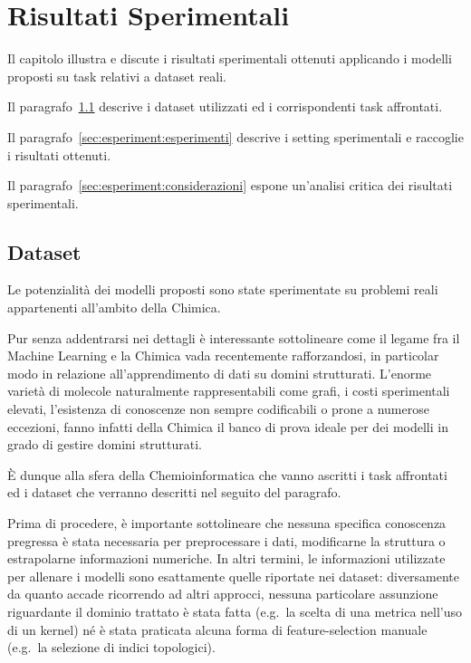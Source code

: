 \chapter{Risultati Sperimentali}\label{ch:esperimenti}
Il capitolo illustra e discute i risultati sperimentali ottenuti applicando i modelli proposti su task relativi a dataset reali.

Il paragrafo~\ref{sec:esperiment:dataset} descrive i dataset utilizzati ed i corrispondenti task affrontati.

Il paragrafo~\ref{sec:esperiment:esperimenti} descrive i setting sperimentali e raccoglie i risultati ottenuti.

Il paragrafo~\ref{sec:esperiment:considerazioni} espone un'analisi critica dei risultati sperimentali.


\section{Dataset}\label{sec:esperiment:dataset}
Le potenzialità dei modelli proposti sono state sperimentate su problemi reali appartenenti all'ambito della Chimica. 

Pur senza addentrarsi nei dettagli è interessante sottolineare come il legame fra il Machine Learning e la Chimica vada recentemente rafforzandosi, in particolar modo in relazione all'apprendimento di dati su domini strutturati. L'enorme varietà di molecole naturalmente rappresentabili come grafi, i costi sperimentali elevati, l'esistenza di conoscenze non sempre codificabili o prone a numerose eccezioni, fanno infatti della Chimica il banco di prova ideale per dei modelli in grado di gestire domini strutturati.

\`E dunque alla sfera della Chemioinformatica che vanno ascritti i task affrontati ed i dataset che verranno descritti nel seguito del paragrafo.

Prima di procedere, è importante sottolineare che nessuna specifica conoscenza pregressa è stata necessaria per preprocessare i dati, modificarne la struttura o estrapolarne informazioni numeriche. In altri termini, le informazioni utilizzate per allenare i modelli sono esattamente quelle riportate nei dataset: diversamente da quanto accade ricorrendo ad altri approcci, nessuna particolare assunzione riguardante il dominio trattato è stata fatta (e.g.\ la scelta di una metrica nell'uso di un kernel) né è stata praticata alcuna forma di feature-selection manuale (e.g.\ la selezione di indici topologici).

